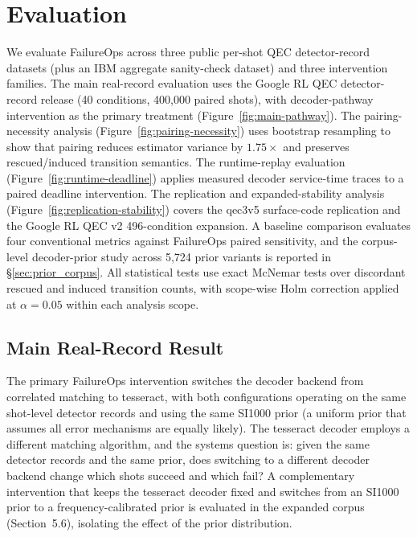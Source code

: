 \section{Evaluation}

We evaluate FailureOps across three public per-shot QEC detector-record datasets (plus an IBM aggregate sanity-check dataset) and three intervention families. The main real-record evaluation uses the Google RL QEC detector-record release (40 conditions, 400,000 paired shots), with decoder-pathway intervention as the primary treatment (Figure~\ref{fig:main-pathway}). The pairing-necessity analysis (Figure~\ref{fig:pairing-necessity}) uses bootstrap resampling to show that pairing reduces estimator variance by $1.75\times$ and preserves rescued/induced transition semantics. The runtime-replay evaluation (Figure~\ref{fig:runtime-deadline}) applies measured decoder service-time traces to a paired deadline intervention. The replication and expanded-stability analysis (Figure~\ref{fig:replication-stability}) covers the qec3v5 surface-code replication and the Google RL QEC v2 496-condition expansion. A baseline comparison evaluates four conventional metrics against FailureOps paired sensitivity, and the corpus-level decoder-prior study across 5,724 prior variants is reported in \S\ref{sec:prior_corpus}. All statistical tests use exact McNemar tests over discordant rescued and induced transition counts, with scope-wise Holm correction applied at $\alpha = 0.05$ within each analysis scope.

\subsection{Main Real-Record Result}

The primary FailureOps intervention switches the decoder backend from correlated matching to tesseract, with both configurations operating on the same shot-level detector records and using the same SI1000 prior (a uniform prior that assumes all error mechanisms are equally likely). The tesseract decoder employs a different matching algorithm, and the systems question is: given the same detector records and the same prior, does switching to a different decoder backend change which shots succeed and which fail? A complementary intervention that keeps the tesseract decoder fixed and switches from an SI1000 prior to a frequency-calibrated prior is evaluated in the expanded corpus (Section~5.6), isolating the effect of the prior distribution.

